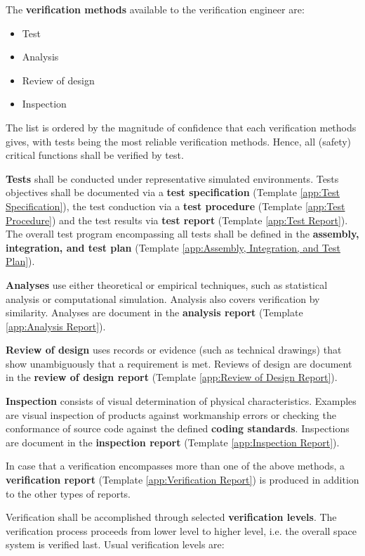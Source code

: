The \textbf{verification methods} available to the verification engineer are:

\begin{itemize}
\item Test
\item Analysis
\item Review of design
\item Inspection
\end{itemize}

The list is ordered by the magnitude of confidence that each verification methods gives, with tests being the most reliable verification methods. Hence, all (safety) critical functions shall be verified by test.

\textbf{Tests} shall be conducted under representative simulated environments. Tests objectives shall be documented via a \textbf{test specification} (Template \ref{app:Test Specification}), the test conduction via a \textbf{test procedure} (Template \ref{app:Test Procedure}) and the test results via \textbf{test report} (Template \ref{app:Test Report}). The overall test program encompassing all tests shall be defined in the \textbf{assembly, integration, and test plan} (Template \ref{app:Assembly, Integration, and Test Plan}).

\textbf{Analyses} use either theoretical or empirical techniques, such as statistical analysis or computational simulation. Analysis also covers verification by similarity. Analyses are document in the \textbf{analysis report} (Template \ref{app:Analysis Report}).

\textbf{Review of design} uses records or evidence (such as technical drawings) that show unambiguously that a requirement is met. Reviews of design are document in the \textbf{review of design report} (Template \ref{app:Review of Design Report}).

\textbf{Inspection} consists of visual determination of physical characteristics. Examples are visual inspection of products against workmanship errors or checking the conformance of source code against the defined \textbf{coding standards}. Inspections are document in the \textbf{inspection report} (Template \ref{app:Inspection Report}).

In case that a verification encompasses more than one of the above methods, a \textbf{verification report} (Template \ref{app:Verification Report}) is produced in addition to the other types of reports.

Verification shall be accomplished through selected \textbf{verification levels}. The verification process proceeds from lower level to higher level, i.e. the overall space system is verified last. Usual verification levels are:

